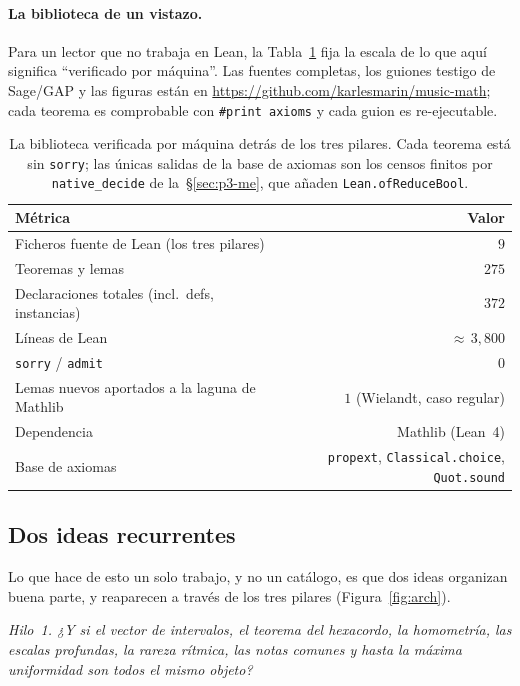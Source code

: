 \documentclass[11pt]{article}
\newcommand{\lean}[1]{\texttt{#1}}
\newcommand{\question}[1]{\smallskip\noindent\textit{#1}\smallskip}
\begin{document}
\paragraph{La biblioteca de un vistazo.} Para un lector que no trabaja en Lean, la
Tabla~\ref{tab:metrics} fija la escala de lo que aquí significa ``verificado por máquina''. Las fuentes
completas, los guiones testigo de Sage/GAP y las figuras están en
\url{https://github.com/karlesmarin/music-math}; cada teorema es comprobable con \lean{\#print axioms} y
cada guion es re-ejecutable.

\begin{table}[tbp]
\centering\small
{}
\begin{tabular}{@{}l r@{}}
\toprule
\rowcolor{ctA!22}
\textbf{Métrica} & \textbf{Valor}\\
\midrule
Ficheros fuente de Lean (los tres pilares) & $9$\\
Teoremas y lemas & $275$\\
Declaraciones totales (incl.\ defs, instancias) & $372$\\
Líneas de Lean & ${\approx}\,3{,}800$\\
\lean{sorry} / \lean{admit} & $0$\\
Lemas nuevos aportados a la laguna de Mathlib & $1$ (Wielandt, caso regular)\\
Dependencia & Mathlib (Lean~4)\\
Base de axiomas & \texttt{propext}, \texttt{Classical.choice}, \texttt{Quot.sound}\\
\bottomrule
\end{tabular}
\caption{La biblioteca verificada por máquina detrás de los tres pilares. Cada teorema está sin
\lean{sorry}; las únicas salidas de la base de axiomas son los censos finitos por \lean{native\_decide} de
la~\S\ref{sec:p3-me}, que añaden \lean{Lean.ofReduceBool}.}
\label{tab:metrics}
\end{table}

\subsection{Dos ideas recurrentes}\label{sec:intro-threads}

Lo que hace de esto un solo trabajo, y no un catálogo, es que dos ideas organizan buena parte, y
reaparecen a través de los tres pilares (Figura~\ref{fig:arch}).

\question{Hilo~1. ¿Y si el vector de intervalos, el teorema del hexacordo, la homometría, las escalas
profundas, la rareza rítmica, las notas comunes y hasta la máxima uniformidad son todos el mismo objeto?}
\end{document}
